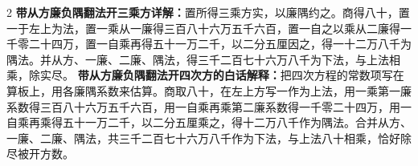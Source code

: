 \documentclass[11pt,a4paper]{article}
\begin{document}
\vspace{0.5em}

\begin{paracol}{2}
\switchcolumn*
\small\textbf{带从方廉负隅翻法开三乘方详解：}置所得三乘方实，以廉隅约之。商得八十，置一于左上为法，置一乘从一廉得三百八十六万五千六百，置一自之以乘从二廉得一千零二十四万，置一自乘再得五十一万二千，以二分五厘因之，得一十二万八千为隅法。并从方、一廉、二廉、隅法，得三千二百七十六万八千为下法，与上法相乘，除实尽。
\switchcolumn
\small\textbf{带从方廉负隅翻法开四次方的白话解释：}把四次方程的常数项写在算板上，用各廉隅系数来估算。商取八十，在左上方写一作为上法，用一乘第一廉系数得三百八十六万五千六百，用一自乘再乘第二廉系数得一千零二十四万，用一自乘再乘得五十一万二千，以二分五厘乘之，得十二万八千作为隅法。合并从方、一廉、二廉、隅法，共三千二百七十六万八千作为下法，与上法八十相乘，恰好除尽被开方数。
\end{paracol}
\end{document}
